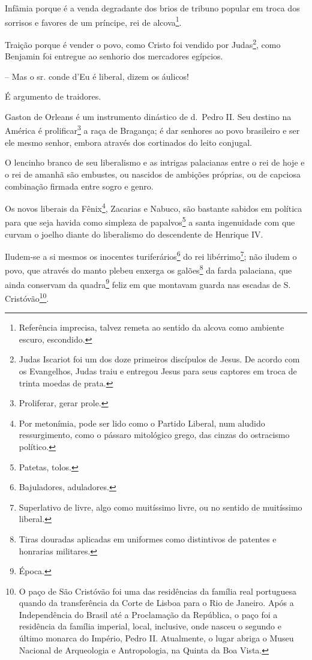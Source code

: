 Infâmia porque é a venda degradante dos brios de tribuno popular em
troca dos sorrisos e favores de um príncipe, rei de alcova\footnote{
  Referência imprecisa, talvez remeta ao sentido da alcova como ambiente
  escuro, escondido.}.

Traição porque é vender o povo, como Cristo foi vendido por
Judas\footnote{Judas Iscariot foi um dos doze primeiros discípulos de
  Jesus. De acordo com os Evangelhos, Judas traiu e entregou Jesus para
  seus captores em troca de trinta moedas de prata.}, como Benjamin foi
entregue ao senhorio dos mercadores egípcios.

-- Mas o sr. conde d'Eu é liberal, dizem os áulicos!

É argumento de traidores.

Gaston de Orleans é um instrumento dinástico de d.~Pedro II. Seu destino
na América é prolificar\footnote{Proliferar, gerar prole.} a raça de
Bragança; é dar senhores ao povo brasileiro e ser ele mesmo senhor,
embora através dos cortinados do leito conjugal.

O lencinho branco de seu liberalismo e as intrigas palacianas entre o
rei de hoje e o rei de amanhã são embustes, ou nascidos de ambições
próprias, ou de capciosa combinação firmada entre sogro e genro.

Os novos liberais da Fênix\footnote{Por metonímia, pode ser lido como
  o Partido Liberal, num aludido ressurgimento, como o pássaro
  mitológico grego, das cinzas do ostracismo político.}, Zacarias e
Nabuco, são bastante sabidos em política para que seja havida como
simpleza de papalvos\footnote{Patetas, tolos.} a santa ingenuidade com
que curvam o joelho diante do liberalismo do descendente de Henrique IV.

Iludem-se a si mesmos os inocentes turiferários\footnote{Bajuladores,
  aduladores.} do rei libérrimo\footnote{Superlativo de livre, algo
  como muitíssimo livre, ou no sentido de muitíssimo liberal.}; não
iludem o povo, que através do manto plebeu enxerga os galões\footnote{
  Tiras douradas aplicadas em uniformes como distintivos de patentes e
  honrarias militares.} da farda palaciana, que ainda conservam da
quadra\footnote{Época.} feliz em que montavam guarda nas escadas de S.
Cristóvão\footnote{O paço de São Cristóvão foi uma das residências da
  família real portuguesa quando da transferência da Corte de Lisboa
  para o Rio de Janeiro. Após a Independência do Brasil até a
  Proclamação da República, o paço foi a residência da família imperial,
  local, inclusive, onde nasceu o segundo e último monarca do Império,
  Pedro II. Atualmente, o lugar abriga o Museu Nacional de Arqueologia e
  Antropologia, na Quinta da Boa Vista.}.

